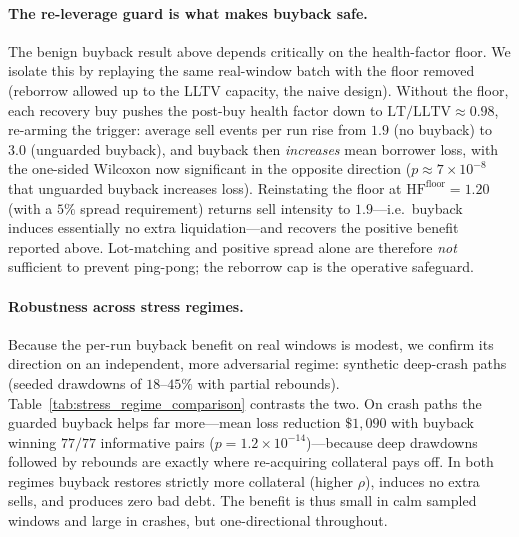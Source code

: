\documentclass[12pt]{article}
\begin{document}
\paragraph{The re-leverage guard is what makes buyback safe.}
The benign buyback result above depends critically on the health-factor floor. We isolate this by replaying the same real-window batch with the floor removed (reborrow allowed up to the LLTV capacity, the naive design). Without the floor, each recovery buy pushes the post-buy health factor down to $\mathrm{LT}/\mathrm{LLTV}\approx0.98$, re-arming the trigger: average sell events per run rise from $1.9$ (no buyback) to $3.0$ (unguarded buyback), and buyback then \emph{increases} mean borrower loss, with the one-sided Wilcoxon now significant in the opposite direction ($p\approx7\times10^{-8}$ that unguarded buyback increases loss). Reinstating the floor at $\mathrm{HF}^{\text{floor}}=1.20$ (with a $5\%$ spread requirement) returns sell intensity to $1.9$---i.e.\ buyback induces essentially no extra liquidation---and recovers the positive benefit reported above. Lot-matching and positive spread alone are therefore \emph{not} sufficient to prevent ping-pong; the reborrow cap is the operative safeguard.

\paragraph{Robustness across stress regimes.}
Because the per-run buyback benefit on real windows is modest, we confirm its direction on an independent, more adversarial regime: synthetic deep-crash paths (seeded drawdowns of $18$--$45\%$ with partial rebounds). Table~\ref{tab:stress_regime_comparison} contrasts the two. On crash paths the guarded buyback helps far more---mean loss reduction $\$1{,}090$ with buyback winning $77/77$ informative pairs ($p=1.2\times10^{-14}$)---because deep drawdowns followed by rebounds are exactly where re-acquiring collateral pays off. In both regimes buyback restores strictly more collateral (higher $\rho$), induces no extra sells, and produces zero bad debt. The benefit is thus small in calm sampled windows and large in crashes, but one-directional throughout.

\end{document}
